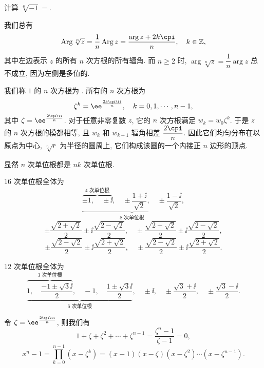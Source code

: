 \begin{exercise}
  计算 $\sqrt[6]{-1}=$\fillblank{}.
\end{exercise}

我们总有
\begin{equation}
  \label{eq:Arg-root-equality}
  \Arg \sqrt[n]z=\frac1n\Arg z=\frac{\arg z+2k\cpi}n,\quad k\in\BZ,
\end{equation}
其中左边表示 $z$ 的所有 $n$ 次方根的所有辐角.
而 $n\ge 2$ 时, $\arg \sqrt[n]z=\dfrac 1n\arg z$ 总不成立, 因为左侧是多值的.

我们称 $1$ 的 $n$ 次方根为 .
所有的 $n$ 次方根为
\[
  \zeta^k=\ee^{\frac{2k\cpi \ii}n},\quad k=0,1,\cdots,n-1,
\]
其中 $\zeta=\ee^{\frac{2\cpi \ii}n}$.
对于任意非零复数 $z$, 它的 $n$ 次方根满足 $w_k=w_0\zeta^k$.
于是 $z$ 的 $n$ 次方根的模都相等, 且 $w_k$ 和 $w_{k+1}$ 辐角相差 $\dfrac{2\cpi}n$.
因此\alert{它们均匀分布在以原点为中心, $\sqrt[n]r$ 为半径的圆周上}, 它们构成该圆的一个内接正 $n$ 边形的顶点.

\begin{example}
  显然 $n$ 次单位根都是 $nk$ 次单位根.
  \begin{enumr}
    \item $16$ 次单位根全体为
    \[
      \underbrace{
        \overbrace{
          \pm1,\quad
          \pm \ii
        }^{\text{$4$ 次单位根}},\quad
        \pm\frac{1+\ii}{\sqrt2},\quad
        \pm\frac{1-\ii}{\sqrt2}
      }_{\text{$8$ 次单位根}},
    \]
    \[
      \pm\frac{\sqrt{2+\sqrt2}}2\pm\ii\frac{\sqrt{2-\sqrt2}}2,\quad
      \pm\frac{\sqrt{2+\sqrt2}}2\pm\ii\frac{\sqrt{2-\sqrt2}}2,
    \]
    \[
      \pm\frac{\sqrt{2-\sqrt2}}2\pm\ii\frac{\sqrt{2+\sqrt2}}2,\quad
      \pm\frac{\sqrt{2-\sqrt2}}2\pm\ii\frac{\sqrt{2+\sqrt2}}2.
    \]
    \vspace{-\baselineskip}
    \item $12$ 次单位根全体为
    \[
      \underbrace{
        \overbrace{
          1,\quad
          \frac{-1\pm\sqrt3\ii}2
        }^{\text{$3$ 次单位根}},\quad
        -1,\quad
        \frac{1\pm\sqrt3\ii}2
      }_{\text{$6$ 次单位根}},\quad
      \pm\ii,\quad
      \pm\frac{\sqrt 3+\ii}2,\quad
      \pm\frac{\sqrt 3-\ii}2.
    \]
    \vspace{-\baselineskip}
    \item 令 $\zeta=\ee^{\frac{2\cpi \ii}n}$, 则我们有
    \[
      1+\zeta+\zeta^2+\cdots+\zeta^{n-1}
      =\frac{\zeta^n-1}{\zeta-1}=0,
    \]
    \[
        x^n-1
      =\prod_{k=0}^{n-1}(x-\zeta^k)
      =(x-1)(x-\zeta)(x-\zeta^2)\cdots(x-\zeta^{n-1}).
    \]
  \end{enumr}
\end{example}


